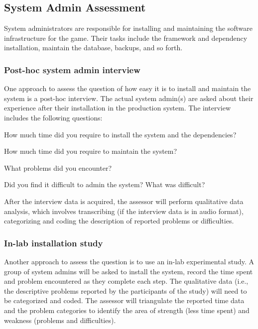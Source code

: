 \subsection{System Admin Assessment}

System administrators are responsible for installing and maintaining the software infrastructure
for the game. Their tasks include the framework and dependency installation, maintain the database, backups, and so forth.

\subsubsection{Post-hoc system admin interview}
\label{Post-hoc system admin interview}

One approach to assess the question of how easy it is to install and maintain the system is a post-hoc interview. The actual system admin(s) are asked about their experience after their installation in the production system. The interview includes the following questions:\\

\begin{compactitem}
\item How much time did you require to install the system and the dependencies?
\item How much time did you require to maintain the system?
\item What problems did you encounter?
\item Did you find it difficult to admin the system? What was difficult?\\
\end{compactitem}

After the interview data is acquired, the assessor will perform qualitative data
analysis, which involves transcribing (if the interview data is in audio format),
categorizing and coding the description of reported problems or difficulties.

\subsubsection{In-lab installation study}
\label{In-lab installation study}

Another approach to assess the question is to use an in-lab experimental study. A group of system admins will 
be asked to install the system, record the time
spent and problem encountered as they complete each step. The qualitative data (i.e., the
descriptive problems reported by the participants of the study) will need to be categorized and
coded. The assessor will triangulate the reported time data and the problem categories to identify
the area of strength (less time spent) and weakness (problems and difficulties).

